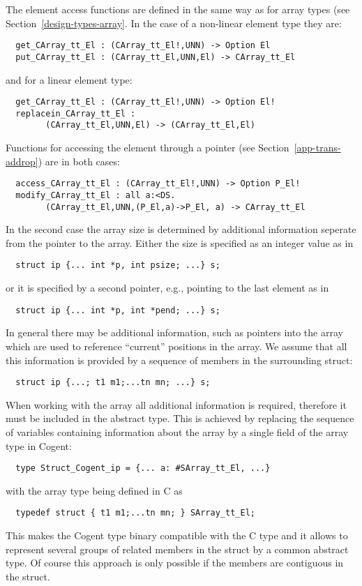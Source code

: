 The element access functions are defined in the same way as for array types (see Section~\ref{design-types-array}. 
In the case of a non-linear element type they are:
\begin{verbatim}
  get_CArray_tt_El : (CArray_tt_El!,UNN) -> Option El
  put_CArray_tt_El : (CArray_tt_El,UNN,El) -> CArray_tt_El
\end{verbatim}
and for a linear element type:
\begin{verbatim}
  get_CArray_tt_El : (CArray_tt_El!,UNN) -> Option El!
  replacein_CArray_tt_El : 
        (CArray_tt_El,UNN,El) -> (CArray_tt_El,El)
\end{verbatim}
Functions for accessing the element through a pointer (see Section~\ref{app-trans-addrop}) are in both cases:
\begin{verbatim}
  access_CArray_tt_El : (CArray_tt_El!,UNN) -> Option P_El!
  modify_CArray_tt_El : all a:<DS. 
        (CArray_tt_El,UNN,(P_El,a)->P_El, a) -> CArray_tt_El
\end{verbatim}

In the second case the array size is determined by additional information seperate from the pointer to the array.
Either the size is specified as an integer value as in 
\begin{verbatim}
  struct ip {... int *p, int psize; ...} s;
\end{verbatim}
or it is specified by a second pointer, e.g., pointing to the last element as in
\begin{verbatim}
  struct ip {... int *p, int *pend; ...} s;
\end{verbatim}
In general there may be additional information, such as pointers into the array which are used to reference
``current'' positions in the array. We assume that all this information is provided by a sequence of members
in the surrounding struct:
\begin{verbatim}
  struct ip {...; t1 m1;...tn mn; ...} s;
\end{verbatim}
When working with the array all additional information is required, therefore it must be included in the abstract
type. This is achieved by replacing the sequence of variables containing information about the array by a single
field of the array type in Cogent:
\begin{verbatim}
  type Struct_Cogent_ip = {... a: #SArray_tt_El, ...}
\end{verbatim}
with the array type being defined in C as
\begin{verbatim}
  typedef struct { t1 m1;...tn mn; } SArray_tt_El;
\end{verbatim}
This makes the Cogent type  binary compatible with the C type  and it allows
to represent several groups of related members in the struct by a common abstract type. Of course this approach is 
only possible if the members are contiguous in the struct.

